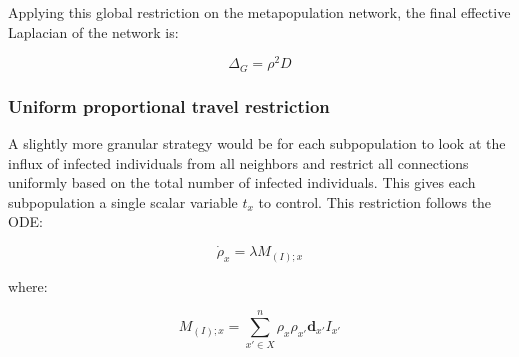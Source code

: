 Applying this global restriction on the metapopulation network, the final effective Laplacian of the network is:

\begin{equation}
\Delta_G = \rho^2 D
\end{equation}

\subsubsection{Uniform proportional travel restriction}

A slightly more granular strategy would be for each subpopulation to look at the influx of infected individuals from all neighbors and restrict all connections uniformly based on the total number of infected individuals. This gives each subpopulation a single scalar variable $t_x$ to control. This restriction follows the ODE:

\begin{equation}
\dot{\rho}_x = \lambda M_{(I);x}
\end{equation}

where:

\begin{equation}
M_{(I);x} = \sum_{x' \in X}^{n} \rho_x \rho_{x'} \mathbf{d}_{x'} I_{x'}
\end{equation}

